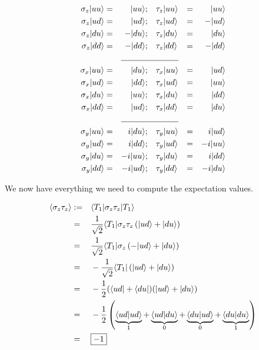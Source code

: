 \documentclass[solutions.tex]{subfiles}
\begin{document}
\begin{equation*}\begin{aligned}
	\sigma_z\ket{uu} &=&\ket{uu};  &&& \tau_z\ket{uu} &=&& \ket{uu} \\
	\sigma_z\ket{ud} &=&\ket{ud};  &&& \tau_z\ket{ud} &=&& -\ket{ud} \\
	\sigma_z\ket{du} &=&-\ket{du}; &&& \tau_z\ket{du} &=&& \ket{du} \\
	\sigma_z\ket{dd} &=&-\ket{dd}; &&& \tau_z\ket{dd} &=&& -\ket{dd} \\
	 \cline{3-6}
	\sigma_x\ket{uu} &=&\ket{du}; &&& \tau_x\ket{uu} &=&& \ket{ud} \\
	\sigma_x\ket{ud} &=&\ket{dd}; &&& \tau_x\ket{ud} &=&& \ket{uu} \\
	\sigma_x\ket{du} &=&\ket{uu}; &&& \tau_x\ket{du} &=&& \ket{dd} \\
	\sigma_x\ket{dd} &=&\ket{ud}; &&& \tau_x\ket{dd} &=&& \ket{du} \\
	 \cline{3-6}
	\sigma_y\ket{uu} &=&i\ket{du};  &&& \tau_y\ket{uu} &=&& i\ket{ud} \\
	\sigma_y\ket{ud} &=&i\ket{dd};  &&& \tau_y\ket{ud} &=&& -i\ket{uu} \\
	\sigma_y\ket{du} &=&-i\ket{uu}; &&& \tau_y\ket{du} &=&& i\ket{dd} \\
	\sigma_y\ket{dd} &=&-i\ket{ud}; &&& \tau_y\ket{dd} &=&& -i\ket{du} \\
\end{aligned}\end{equation*}

We now have everything we need to compute the expectation values.

\hrr
\begin{equation*}\begin{aligned}
	\left\langle \sigma_z\tau_z \right\rangle &:=&& \langle T_1|\sigma_z\tau_z|T_1\rangle \\
	~ &=&& \frac1{\sqrt2}\langle T_1|\sigma_z\tau_z\left(|ud\rangle+|du\rangle\right) \\
	~ &=&& \frac1{\sqrt2}\langle T_1|\sigma_z\left(-|ud\rangle+|du\rangle\right) \\
	~ &=&& -\frac1{\sqrt2}\langle T_1|\left(|ud\rangle+|du\rangle\right) \\
	~ &=&& -\frac12(\langle ud|+\langle du|)(|ud\rangle+|du\rangle) \\
	~ &=&& -\frac12\left(
		\underbrace{\left\langle ud \middle| ud \right\rangle}_{1}
		+\underbrace{\left\langle ud \middle| du \right\rangle}_{0}
		+\underbrace{\left\langle du \middle| ud \right\rangle}_{0}
		+\underbrace{\left\langle du \middle| du \right\rangle}_{1}
	\right) \\
	~ &=&&\boxed{-1}
\end{aligned}\end{equation*}
\end{document}
